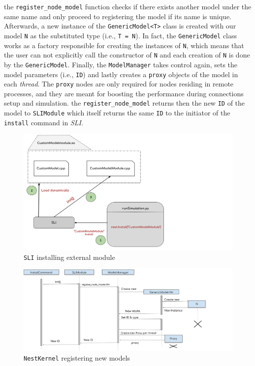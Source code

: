the \texttt{register\_node\_model} function checks if there exists another model under the same name and only proceed to registering the model if its name is unique. Afterwards, a new instance of the \texttt{GenericModel<T>} class is created with our model \texttt{N} as the substituted type (i.e., \texttt{T = N}). In fact, the \texttt{GenericModel} class works as a factory responsible for creating the instances of \texttt{N}, which means that  the user can not explicitly call the constructor of \texttt{N} and each creation of \texttt{N} is done by the \texttt{GenericModel}. Finally, the \texttt{ModelManager} takes control again, sets the model parameters (i.e., \texttt{ID}) and lastly creates a \texttt{proxy} objects of the model in each \emph{thread}. The \texttt{proxy} nodes are only required for nodes residing in remote processes, and they are meant for boosting the performance during connections setup and simulation. the \texttt{register\_node\_model} returns then the new \texttt{ID} of the model to \texttt{SLIModule} which itself returns the same \texttt{ID} to the initiator of the \texttt{install} command in \emph{SLI}.
 
 
 \begin{figure}[ht!]
\centering
\includegraphics[width=1.2\textwidth,height=1.2\textheight,keepaspectratio]{src/pic/install_command.png}
\caption{\texttt{SLI} installing external module }
\label{fig:sli_install}
\end{figure}

\vspace{0.5cm}
\begin{figure}[ht!]
\centering
\includegraphics[width=1.2\textwidth,height=1.3\textheight,keepaspectratio]{src/pic/register.png}
\caption{\texttt{NestKernel} registering new models }
\label{fig:nestknerl_register}
\end{figure}

